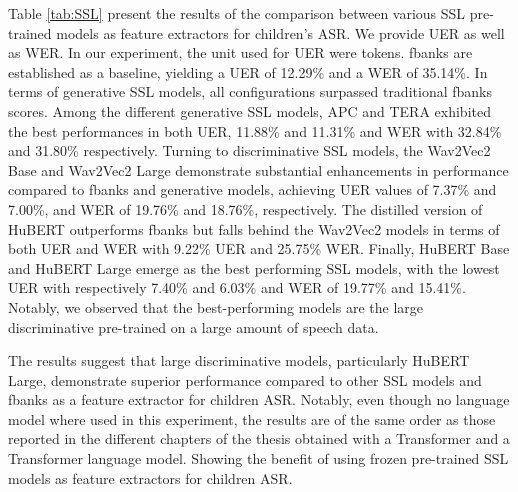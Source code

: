 Table \ref{tab:SSL} present the results of the comparison between various \ac{SSL} pre-trained models as feature extractors for children's \ac{ASR}. We provide \ac{UER} as well as \ac{WER}. In our experiment, the unit used for \ac{UER} were tokens. \ac{fbanks} are established as a baseline, yielding a \ac{UER} of 12.29\% and a \ac{WER} of 35.14\%. In terms of generative \ac{SSL} models, all configurations surpassed traditional \ac{fbanks} scores. Among the different generative \ac{SSL} models, APC  and \ac{TERA} exhibited the best performances in both \ac{UER}, 11.88\% and 11.31\% and \ac{WER} with 32.84\% and 31.80\% respectively. Turning to discriminative \ac{SSL} models, the Wav2Vec2 Base and Wav2Vec2 Large demonstrate substantial enhancements in performance compared to fbanks and generative models, achieving \ac{UER} values of 7.37\% and 7.00\%, and \ac{WER} of 19.76\% and 18.76\%, respectively. The distilled version of HuBERT outperforms \ac{fbanks} but falls behind the Wav2Vec2 models in terms of both \ac{UER} and \ac{WER} with 9.22\% \ac{UER} and 25.75\% \ac{WER}. Finally, HuBERT Base and HuBERT Large emerge as the best performing \ac{SSL} models, with the lowest \ac{UER} with respectively 7.40\% and 6.03\% and \ac{WER} of 19.77\% and 15.41\%. Notably, we observed that the best-performing models are the large discriminative pre-trained on a large amount of speech data.

The results suggest that large discriminative models, particularly HuBERT Large, demonstrate superior performance compared to other \ac{SSL} models and \ac{fbanks} as a feature extractor for children \ac{ASR}. Notably, even though no language model where used in this experiment, the results are of the same order as those reported in the different chapters of the thesis obtained with a Transformer and a Transformer language model. Showing the benefit of using frozen pre-trained \ac{SSL} models as feature extractors for children \ac{ASR}.

